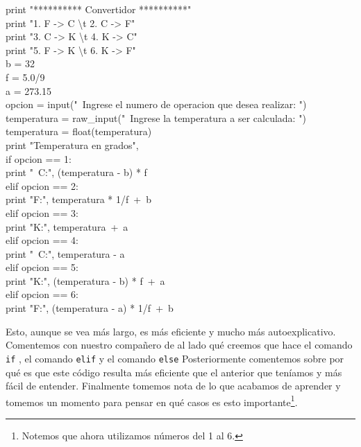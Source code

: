 \documentclass[10pt,letterpaper]{article}
\newcommand{\inlinecode}[1]{
\colorbox{light-gray}{\texttt{#1}}
}
\newenvironment{Code}
{
\begin{lrbox}{\selvestebox}%
\begin{minipage}{\dimexpr\columnwidth-2\fboxsep\relax}
\fontfamily{\ttdefault}\selectfont
}
{\end{minipage}\end{lrbox}%
\begin{center}
\colorbox{light-gray}{\usebox{\selvestebox}}
\end{center}
}
\begin{document}
\begin{small}
\begin{Code}
print "********** Convertidor **********"\\
print "1. F -> C \textbackslash t 2. C -> F"\\
print "3. C -> K \textbackslash t 4. K -> C"\\
print "5. F -> K \textbackslash t 6. K -> F"\\
b = 32\\
f = 5.0/9\\
a = 273.15\\
opcion = input("\ \hspace{-2mm}Ingrese el numero de operacion que desea realizar: ")\\
temperatura = raw\_input("\ \hspace{-2mm}Ingrese la temperatura a ser calculada: ")\\
temperatura = float(temperatura)\\
print "Temperatura en grados",\\
if opcion == 1:\\
\hspace*{5mm} print "\ \hspace*{-2mm}C:", (temperatura - b) * f\\
elif opcion == 2:\\
\hspace*{5mm} print "F:", temperatura * 1/f\ +\ b\\
elif opcion == 3:\\
\hspace*{5mm} print "K:", temperatura\ +\ a\\
elif opcion == 4:\\
\hspace*{5mm} print "\ \hspace*{-2mm}C:", temperatura - a\\
elif opcion == 5:\\
\hspace*{5mm} print "K:", (temperatura - b) * f\ +\ a\\
elif opcion == 6:\\
\hspace*{5mm} print "F:", (temperatura - a) * 1/f\ +\ b
\end{Code}
\end{small}

Esto, aunque se vea m\'as largo, es m\'as eficiente y mucho m\'as autoexplicativo. Comentemos con nuestro compa\~nero de al lado qu\'e creemos que hace el comando \inlinecode{if}, el comando \inlinecode{elif} y el comando \inlinecode{else} Posteriormente comentemos sobre por qu\'e es que este c\'odigo resulta m\'as eficiente que el anterior que ten\'iamos y m\'as f\'acil de entender. Finalmente tomemos nota de lo que acabamos de aprender y tomemos un momento para pensar en qu\'e casos es esto importante\footnote{Notemos que ahora utilizamos n\'umeros del 1 al 6.}.
\end{document}
